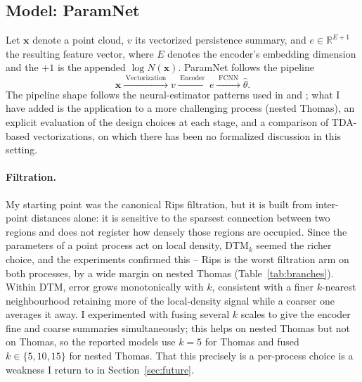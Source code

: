 \documentclass[11pt,a4paper]{article}
\newcommand{\R}{\mathbb{R}}
\newcommand{\pc}{\mathbf{x}}
\begin{document}
\subsection{Model: ParamNet}
\label{ssec:method}

Let $\pc$ denote a point cloud, $v$ its vectorized persistence summary, and
$e \in \R^{E + 1}$ the resulting feature vector, where $E$ denotes the encoder's
embedding dimension and the $+1$ is the appended $\log N(\pc)$. ParamNet
follows the pipeline
    \begin{equation}
    \label{eq:pipeline}
    \pc \xrightarrow{\;\text{Vectorization}\;} v
    \xrightarrow{\;\text{Encoder}\;} e
    \xrightarrow{\;\text{FCNN}\;} \hat\theta.
    \end{equation}
The pipeline shape follows the neural-estimator patterns used in
\citet{vihrs2022neural} and \citet{yip2025learning}; what I have added is the
application to a more challenging process (nested Thomas), an explicit
evaluation of the design choices at each stage, and a comparison of TDA-based
vectorizations, on which there has been no formalized discussion in this
setting.

\paragraph{Filtration.} My starting point was the canonical Rips filtration,
but it is built from inter-point distances alone: it is sensitive to the
sparsest connection between two regions and does not register how densely those
regions are occupied. Since the parameters of a point process act on local
density, DTM$_k$ seemed the richer choice, and the experiments
confirmed this -- Rips is the worst filtration arm on both processes, by a wide margin on nested Thomas (Table~\ref{tab:branches}). Within DTM, error grows monotonically with $k$, consistent with a finer $k$-nearest neighbourhood retaining more of the local-density signal while a coarser one averages it away. I experimented with fusing several $k$ scales to give the encoder fine and coarse summaries simultaneously; this helps on nested Thomas but not on Thomas, so the reported models use $k=5$ for Thomas and fused $k\in\{5,10,15\}$ for nested Thomas. That this precisely is a per-process choice is a weakness I return to in Section~\ref{sec:future}.
\end{document}
